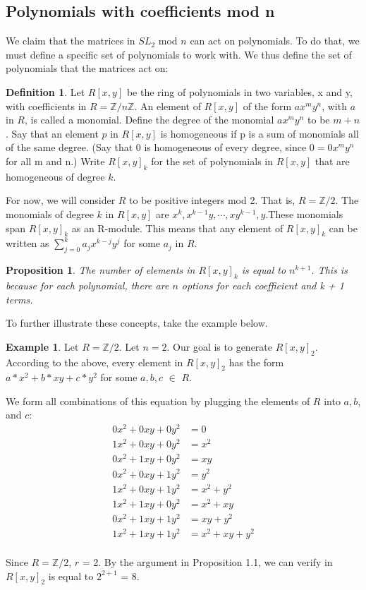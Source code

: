 \documentclass[a4paper,draft]{amsproc}
\theoremstyle{plain}
\newtheorem{prop}{Proposition}[section]
\theoremstyle{definition}
\newtheorem{exm}{Example}[section]
\newtheorem{dfn}{Definition}[section]
\theoremstyle{remark}
\numberwithin{equation}{section}
\begin{document}
\subsection{Polynomials with coefficients mod n}
We claim that the matrices in $SL_{2}$ mod $n$ can act on polynomials. To do that, we must define a specific set of polynomials to work with. 
We thus define the set of polynomials that the matrices act on: 

\begin{dfn}
Let $R[x,y]$ be the ring of polynomials in two variables, x and y, with coefficients in $R = \mathbb{Z}/n\mathbb{Z}$. An element of $R[x,y]$ of the form  $ax^{m}y^{n}$, with $a$ in $R$, is called a monomial. Define the degree of the monomial $ax^{m}y^{n}$ to be $m+n$. Say that an element $p$ in $R[x,y]$ is homogeneous if p is a sum of monomials all of the same degree. (Say that 0 is homogeneous of every degree, since $0=0x^{m}y^{n}$ for all m and n.) Write $R[x,y]_{k}$ for the set of polynomials in $R[x,y]$ that are homogeneous of degree $k$.
\end{dfn}
For now, we will consider $R$ to be positive integers mod 2. That is, $R = \mathbb{Z}/2$. The monomials of degree $k$ in $R[x,y]$ are $x^k, x^{k-1}y, \cdots, xy^{k-1}, y$.These monomials span $R[x,y]_{k}$ as an R-module. This means that any element of $R[x,y]_{k}$ can be written as $\sum_{j=0}^k a_jx^{k-j}y^j$ for some $a_{j}$ in $R$. 

\begin{prop}
The number of elements in $R[x,y]_{k}$ is equal to $n^{k + 1}$. This is because for each polynomial, there are $n$ options for each coefficient and k + 1 terms.
\end{prop}
 
To further illustrate these concepts, take the example below. 
\begin{exm}
Let $R = \mathbb{Z}/2$.  Let $n = 2$. Our goal is to generate $R[x,y]_{2}$. 
According to the above, every element in $R[x,y]_{2}$ has the form $a*x^{2} + b*xy + c*y^{2}$ for some $a, b, c$ $\in$  $R$.

We form all combinations of this equation by plugging the elements of $R$ into $a, b$, and $c$: 
\begin{align*}
0x^{2} + 0xy + 0y^{2} &= 0 \\
1x^{2} + 0xy + 0y^{2} &= x^{2} \\
0x^{2} +1xy + 0y^{2}  &= xy \\
0x^{2} + 0xy + 1y^{2} &= y^{2} \\
1x^{2} + 0xy + 1y^{2} &= x^{2} + y^{2} \\
1x^{2} + 1xy + 0y^{2} &= x^{2} + xy \\
0x^{2} + 1xy + 1y^{2} &= xy + y^{2} \\
1x^{2} + 1xy + 1y^{2}  &= x^{2} + xy + y^{2}\\
\end{align*}

Since  $R = \mathbb{Z}/2$, $r$ = 2. By the argument in Proposition 1.1, we can verify  in $R[x,y]_{2}$ is equal to $2^{2 + 1}$ = 8.
\end{exm}
\end{document}
